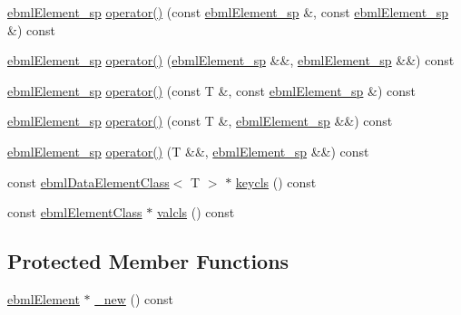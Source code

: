 \begin{DoxyCompactItemize}
\mbox{\hyperlink{namespaceebml_adad533b7705a16bb360fe56380c5e7be}{ebml\+Element\+\_\+sp}} \mbox{\hyperlink{classebml_1_1ebmlPairClass_a7f292456eaed4b0cebfbdd1c7f137444}{operator()}} (const \mbox{\hyperlink{namespaceebml_adad533b7705a16bb360fe56380c5e7be}{ebml\+Element\+\_\+sp}} \&, const \mbox{\hyperlink{namespaceebml_adad533b7705a16bb360fe56380c5e7be}{ebml\+Element\+\_\+sp}} \&) const
\item 
\mbox{\hyperlink{namespaceebml_adad533b7705a16bb360fe56380c5e7be}{ebml\+Element\+\_\+sp}} \mbox{\hyperlink{classebml_1_1ebmlPairClass_abe0424fbc5ad585ed11693f9d9f71f9e}{operator()}} (\mbox{\hyperlink{namespaceebml_adad533b7705a16bb360fe56380c5e7be}{ebml\+Element\+\_\+sp}} \&\&, \mbox{\hyperlink{namespaceebml_adad533b7705a16bb360fe56380c5e7be}{ebml\+Element\+\_\+sp}} \&\&) const
\item 
\mbox{\hyperlink{namespaceebml_adad533b7705a16bb360fe56380c5e7be}{ebml\+Element\+\_\+sp}} \mbox{\hyperlink{classebml_1_1ebmlPairClass_ab34a8f614bf92ab90fb37d178aaa0f0b}{operator()}} (const T \&, const \mbox{\hyperlink{namespaceebml_adad533b7705a16bb360fe56380c5e7be}{ebml\+Element\+\_\+sp}} \&) const
\item 
\mbox{\hyperlink{namespaceebml_adad533b7705a16bb360fe56380c5e7be}{ebml\+Element\+\_\+sp}} \mbox{\hyperlink{classebml_1_1ebmlPairClass_adf29892f267e47bd519b20811ed8e449}{operator()}} (const T \&, \mbox{\hyperlink{namespaceebml_adad533b7705a16bb360fe56380c5e7be}{ebml\+Element\+\_\+sp}} \&\&) const
\item 
\mbox{\hyperlink{namespaceebml_adad533b7705a16bb360fe56380c5e7be}{ebml\+Element\+\_\+sp}} \mbox{\hyperlink{classebml_1_1ebmlPairClass_abaeddeedcfdddb43a87175bf7f17dc31}{operator()}} (T \&\&, \mbox{\hyperlink{namespaceebml_adad533b7705a16bb360fe56380c5e7be}{ebml\+Element\+\_\+sp}} \&\&) const
\item 
const \mbox{\hyperlink{classebml_1_1ebmlDataElementClass}{ebml\+Data\+Element\+Class}}$<$ T $>$ $\ast$ \mbox{\hyperlink{classebml_1_1ebmlPairClass_a94538c4319b9d572bce2c05f6d999410}{keycls}} () const
\item 
const \mbox{\hyperlink{classebml_1_1ebmlElementClass}{ebml\+Element\+Class}} $\ast$ \mbox{\hyperlink{classebml_1_1ebmlPairClass_ac4726d7f429838e8ec8e2d294b680a3d}{valcls}} () const
\end{DoxyCompactItemize}
\subsection*{Protected Member Functions}
\begin{DoxyCompactItemize}
\item 
\mbox{\hyperlink{classebml_1_1ebmlElement}{ebml\+Element}} $\ast$ \mbox{\hyperlink{classebml_1_1ebmlPairClass_abb748027028719a4a1682c089ac21226}{\+\_\+new}} () const
\end{DoxyCompactItemize}
